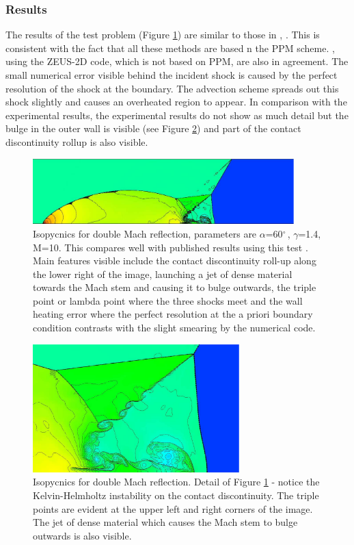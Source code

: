 \subsubsection{Results}
The results of the test problem (Figure \ref{fig:3-2}) are similar to those in
\citet{Toth96:_compar,1996PhDT........56D}, \citet{1984jcp_woodward_colella}.
This is consistent with the fact that all these methods are based n the PPM
scheme. \citet{1992ApJS...80..753S}, using the ZEUS-2D code, which is not based on PPM, are also in agreement. The small numerical error visible behind the incident shock is caused by the perfect resolution of the shock at the boundary. The advection scheme spreads out this shock slightly and causes an overheated region to appear.
In comparison with the experimental results, the experimental results do not show as much detail but the bulge in the outer wall is visible (see Figure \ref{fig:3-3}) and part of the contact discontinuity rollup is also visible.


\begin{figure}[t]
\centering
\includegraphics[width=0.9\textwidth]{dmr}
\caption{
Isopycnics for double Mach reflection, parameters are $\alpha$=60$^{\circ~}$, $\gamma$=1.4, M=10. 
This compares well with published results using this test \citep{1984jcp_woodward_colella, 1992ApJS...80..753S, 1989JCoPh..82...64B}.
Main features visible include the contact discontinuity roll-up along the lower right of the image, launching a jet of dense material towards the Mach stem and causing it to bulge outwards, the triple point or lambda point where the three shocks meet and the wall heating error where the perfect resolution at the a priori boundary condition contrasts with the slight smearing by the numerical code.
}
\label{fig:3-2} %
\end{figure}


\begin{figure}[t]
\centering
\includegraphics[width=8cm]{kh2}
\caption{
Isopycnics for double Mach reflection. 
Detail of Figure \ref{fig:3-2} - notice the Kelvin-Helmholtz instability on the contact discontinuity.
The triple points are evident at the upper left and right corners of the image.
The jet of dense material which causes the Mach stem to bulge outwards is also visible.
}
\label{fig:3-3} %
\end{figure}

